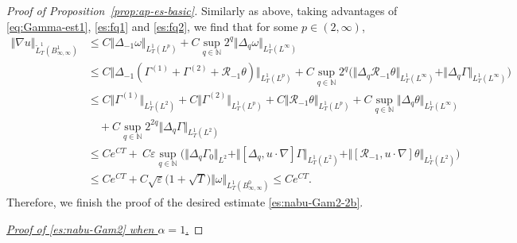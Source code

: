 \documentclass[reqno,11pt,a4paper]{amsart}
\begin{document}
\begin{proof}[Proof of Proposition~\ref{prop:ap-es-basic}]
Similarly as above, taking advantages of \eqref{eq:Gamma-est1}, \eqref{es:fq1} and \eqref{es:fq2}, we find that for some $p\in (2,\infty)$,
\begin{align*}
  \Vert \nabla u\Vert _{\widetilde{L}^1_T( B^1_{\infty,\infty})}
  & \leq  C \Vert \Delta_{-1}\omega\Vert _{L^1_T(L^p)}
  + C \sup_{q\in\mathbb{N}} 2^{q}\Vert \Delta_q \omega\Vert _{L^1_T(L^\infty)} \\
  &\leq  C \Vert \Delta_{-1} (\Gamma^{(1)} + \Gamma^{(2)} + \mathcal{R}_{-1}\theta)\Vert _{L^1_T(L^p)}
  + C \sup_{q\in\mathbb{N}} 2^{q} \Big(\Vert \Delta_q \mathcal{R}_{-1}\theta\Vert _{L^1_T(L^\infty)}
  + \Vert \Delta_q \Gamma\Vert _{L^1_T(L^\infty)}\Big) \\
  &\leq C \Vert \Gamma^{(1)}\Vert _{L^1_T(L^2)} + C \Vert \Gamma^{(2)}\Vert _{L^1_T(L^p)} 
  + C \Vert \mathcal{R}_{-1}\theta\Vert _{L^1_T(L^p)}
  + C \sup_{q\in \mathbb{N}} \Vert \Delta_q \theta\Vert _{L^1_T(L^\infty)} \\
  & \quad + C \sup_{q\in\mathbb{N}} 2^{2q} \Vert  \Delta_q \Gamma\Vert _{L^1_T(L^2)} \\
  &\leq C e^{CT} +  \ C \varepsilon \sup_{q\in\mathbb{N}} \Big( \Vert \Delta_q \Gamma_0\Vert _{L^2}
  + \Vert [\Delta_q,u\cdot\nabla]\Gamma \Vert _{L^1_T(L^2)} + \Vert [\mathcal{R}_{-1},u\cdot\nabla]\theta\Vert _{L^1_T(L^2)}\Big) \\
  &\leq C e^{CT} + C \sqrt{\varepsilon} \big(1+\sqrt{T} \big)
  \Vert \omega\Vert _{L^1_T(B^0_{\infty,\infty})} \leq C e^{CT}.
\end{align*}
Therefore, we finish the proof of the desired estimate \eqref{es:nabu-Gam2-2b}.

\underline{\textit{Proof of \eqref{es:nabu-Gam2} when $\alpha=1$}.}  


\end{proof}
\end{document}
